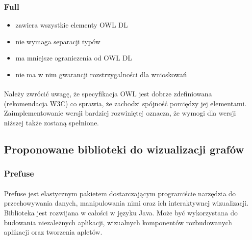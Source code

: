 \documentclass[a4paper,10pt]{article}
\begin{document}
\subsubsection{Full}
	\begin{itemize}
	\item zawiera wszystkie elementy OWL DL
	\item nie wymaga separacji typów
	\item ma mniejsze ograniczenia od OWL DL
	\item nie ma w nim gwarancji rozstrzygalności dla wnioskowań
	\end{itemize}

\paragraph{} Należy zwrócić uwagę, że specyfikacja OWL jest dobrze zdefiniowana (rekomendacja W3C\cite{specyfikacjaW3C}) co sprawia, że zachodzi spójność pomiędzy jej elementami. Zaimplementowanie wersji bardziej rozwiniętej oznacza, że wymogi dla wersji niższej także zostaną spełnione.


\subsection{Proponowane biblioteki do wizualizacji grafów}
\subsubsection{Prefuse}

\paragraph{} Prefuse jest elastycznym pakietem dostarczającym programiście narzędzia do przechowywania danych, manipulowania nimi oraz ich interaktywnej wizualizacji. Biblioteka jest rozwijana w całości w języku Java. Może być wykorzystana do budowania niezależnych aplikacji, wizualnych komponentów rozbudowanych aplikacji oraz tworzenia apletów.
\end{document}
